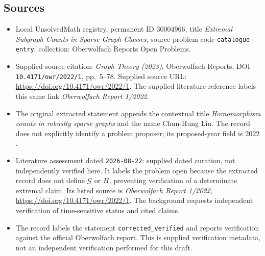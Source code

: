 \documentclass[11pt]{article}
\begin{document}
\subsection{Sources}
\begin{itemize}
\item Local UnsolvedMath registry, permanent ID \(30004966\), title \emph{Extremal Subgraph Counts in Sparse Graph Classes}, source problem code \texttt{catalogue entry}; collection: Oberwolfach Reports Open Problems.
\item Supplied source citation: \emph{Graph Theory (2023)}, Oberwolfach Reports, DOI \texttt{10.4171/owr/2022/1}, pp.~5--78. Supplied source URL: \url{https://doi.org/10.4171/owr/2022/1}. The supplied literature reference labels this same link \emph{Oberwolfach Report 1/2022}.
\item The original extracted statement appends the contextual title \emph{Homomorphism counts in robustly sparse graphs} and the name Chun-Hung Liu. The record does not explicitly identify a problem proposer; its proposed-year field is \(2022\).
\item Literature assessment dated \texttt{2026-08-22}: supplied dated curation, not independently verified here. It labels the problem open because the extracted record does not define \(\mathcal G\) or \(H\), preventing verification of a determinate extremal claim. Its listed source is \emph{Oberwolfach Report 1/2022}, \url{https://doi.org/10.4171/owr/2022/1}. The background requests independent verification of time-sensitive status and cited claims.
\item The record labels the statement \texttt{corrected\_verified} and reports verification against the official Oberwolfach report. This is supplied verification metadata, not an independent verification performed for this draft.
\end{itemize}
\end{document}
